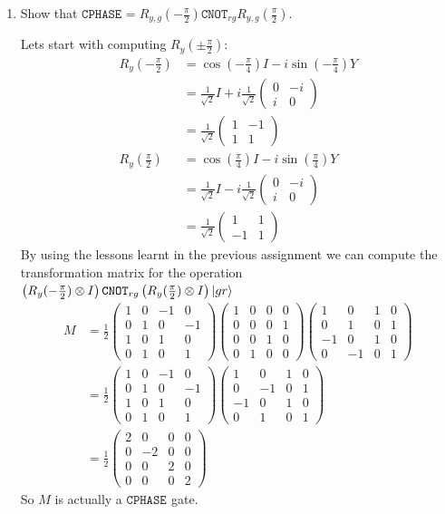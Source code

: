 \documentclass[12pt]{article}
\newcommand{\pmat}[1]{\begin{pmatrix}#1\end{pmatrix}}
\newcommand{\rsqrt}[1]{\ensuremath{\frac{1}{\sqrt{#1}}}}
\newenvironment{answer}{\begingroup\setlength{\leftskip}{-\leftmargin}\begin{framed}}{\end{framed}\endgroup}
\newcommand{\CNOT}[1]{\ensuremath{\texttt{CNOT}_{#1}}}
\newcommand{\CPHASE}[1]{\ensuremath{\texttt{CPHASE}_{#1}}}
\begin{document}
\begin{enumerate}
    \item Show that $\CPHASE{} = R_{y,g}(-\frac{\pi}{2})\CNOT{rg}R_{y,g}(\frac{\pi}{2})$.

    \begin{answer}
        Lets start with computing $R_{y}(\pm\frac{\pi}{2})$:
        \begin{align*}
            R_y(-\frac{\pi}{2}) &= \cos(-\frac{\pi}{4})I - i\sin(-\frac{\pi}{4})Y \\
                &= \rsqrt{2}I + i\rsqrt{2}\pmat{0 & -i \\ i & 0} \\
                &= \rsqrt{2}\pmat{1 & -1 \\ 1 & 1} \\
            R_y(\frac{\pi}{2}) &= \cos(\frac{\pi}{4})I - i\sin(\frac{\pi}{4})Y \\
                &= \rsqrt{2}I - i\rsqrt{2}\pmat{0 & -i \\ i & 0} \\
                &= \rsqrt{2}\pmat{1 & 1 \\ -1 & 1}
        \end{align*}
        By using the lessons learnt in the previous assignment we can compute the transformation matrix for the operation $\left(R_{y}(-\frac{\pi}{2}) \otimes I\right)\CNOT{rg}\left(R_{y}(\frac{\pi}{2}) \otimes I\right)\ket{gr}$
        \begin{align*}
            M &= \frac{1}{2}
                \pmat{1 & 0 & -1 & 0 \\ 0 & 1 & 0 & -1 \\ 1 & 0 & 1 & 0 \\ 0 & 1 & 0 & 1}
                \pmat{1 & 0 & 0 & 0 \\ 0 & 0 & 0 & 1 \\ 0 & 0 & 1 & 0 \\ 0 & 1 & 0 & 0}
                \pmat{1 & 0 & 1 & 0 \\ 0 & 1 & 0 & 1 \\ -1 & 0 & 1 & 0 \\ 0 & -1 & 0 & 1} \\
            &= \frac{1}{2}
                \pmat{1 & 0 & -1 & 0 \\ 0 & 1 & 0 & -1 \\ 1 & 0 & 1 & 0 \\ 0 & 1 & 0 & 1}
                \pmat{1 & 0 & 1 & 0 \\ 0 & -1 & 0 & 1 \\ -1 & 0 & 1 & 0 \\ 0 & 1 & 0 & 1} \\
            &= \frac{1}{2}
                \pmat{2 & 0 & 0 & 0 \\ 0 & -2 & 0 & 0 \\ 0 & 0 & 2 & 0 \\ 0 & 0 & 0 & 2}
        \end{align*}
        So $M$ is actually a \CPHASE{} gate.
    \end{answer}


\end{enumerate}
\end{document}

